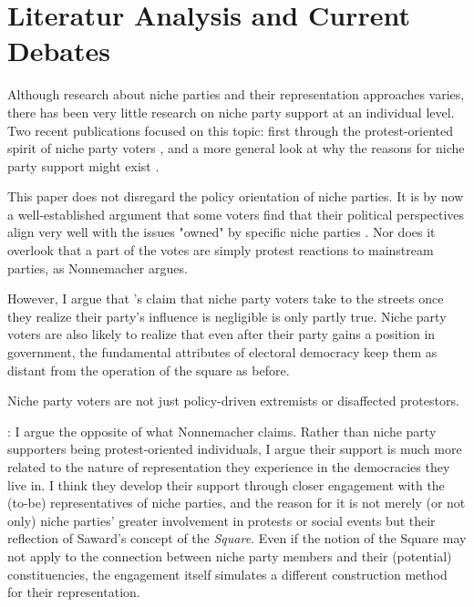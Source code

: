 \section{Literatur Analysis and Current Debates}\label{sec:Literatur Analysis and Current Debates} %


Although research about niche parties and their representation approaches varies, there has been very little research on niche party support at an individual level. Two recent publications focused on this topic: first through the protest-oriented spirit of niche party voters \parencite{nonnemacher2023}, and a more general look at why the reasons for niche party support might exist \parencite{stiers2024}.




This paper does not disregard the policy orientation of niche parties. It is by now a well-established argument that some voters find that their political perspectives align very well with the issues "owned" by specific niche parties \parencite{meguid2005}. Nor does it overlook that a part of the votes are simply protest reactions to mainstream parties, as Nonnemacher \cite*{nonnemacher2023} argues.

However, I argue that \cite{nonnemacher2023}'s claim that niche party voters take to the streets once they realize their party's influence is negligible is only partly true. Niche party voters are also likely to realize that even after their party gains a position in government, the fundamental attributes of electoral democracy keep them as distant from the operation of the square as before.

Niche party voters are not just policy-driven extremists or disaffected protestors.

: I argue the opposite of what Nonnemacher claims. Rather than niche party supporters being protest-oriented individuals, I argue their support is much more related to the nature of representation they experience in the democracies they live in. I think they develop their support through closer engagement with the (to-be) representatives of niche parties, and the reason for it is not merely (or not only) niche parties' greater involvement in protests or social events but their reflection of Saward's concept of the \textit{Square}.
Even if the notion of the Square may not apply to the connection between niche party members and their (potential) constituencies, the engagement itself simulates a different construction method for their representation.


